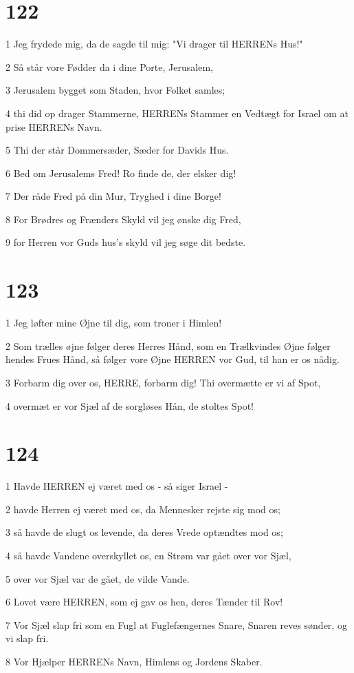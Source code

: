 \chapter{122}

\par 1 Jeg frydede mig, da de sagde til mig: "Vi drager til HERRENs Hus!"
\par 2 Så står vore Fødder da i dine Porte, Jerusalem,
\par 3 Jerusalem bygget som Staden, hvor Folket samles;
\par 4 thi did op drager Stammerne, HERRENs Stammer en Vedtægt for Israel om at prise HERRENs Navn.
\par 5 Thi der står Dommersæder, Sæder for Davids Hus.
\par 6 Bed om Jerusalems Fred! Ro finde de, der elsker dig!
\par 7 Der råde Fred på din Mur, Tryghed i dine Borge!
\par 8 For Brødres og Frænders Skyld vil jeg ønske dig Fred,
\par 9 for Herren vor Guds hus's skyld vil jeg søge dit bedste.

\chapter{123}

\par 1 Jeg løfter mine Øjne til dig, som troner i Himlen!
\par 2 Som trælles øjne følger deres Herres Hånd, som en Trælkvindes Øjne følger hendes Frues Hånd, så følger vore Øjne HERREN vor Gud, til han er os nådig.
\par 3 Forbarm dig over os, HERRE, forbarm dig! Thi overmætte er vi af Spot,
\par 4 overmæt er vor Sjæl af de sorgløses Hån, de stoltes Spot!

\chapter{124}

\par 1 Havde HERREN ej været med os - så siger Israel -
\par 2 havde Herren ej været med os, da Mennesker rejste sig mod os;
\par 3 så havde de slugt os levende, da deres Vrede optændtes mod os;
\par 4 så havde Vandene overskyllet os, en Strøm var gået over vor Sjæl,
\par 5 over vor Sjæl var de gået, de vilde Vande.
\par 6 Lovet være HERREN, som ej gav os hen, deres Tænder til Rov!
\par 7 Vor Sjæl slap fri som en Fugl at Fuglefængernes Snare, Snaren reves sønder, og vi slap fri.
\par 8 Vor Hjælper HERRENs Navn, Himlens og Jordens Skaber.

